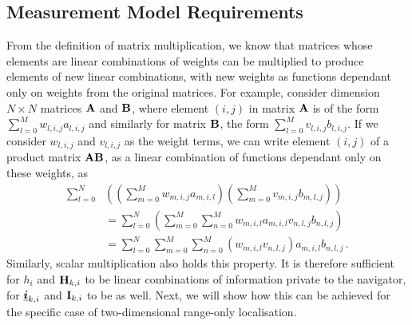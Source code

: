 \documentclass[twocolumn]{autart}
\begin{document}
% 
% 

\subsection{Measurement Model Requirements}
From the definition of matrix multiplication, we know that matrices whose elements are linear combinations of weights can be multiplied to produce elements of new linear combinations, with new weights as functions dependant only on weights from the original matrices. For example, consider dimension $N\times N$ matrices ${{\mathbf{A}}}$ and ${{\mathbf{B}}}$, where element $(i,j)$ in matrix ${{\mathbf{A}}}$ is of the form $\sum_{l=0}^M w_{l,i,j}a_{l,i,j}$ and similarly for matrix ${{\mathbf{B}}}$, the form $\sum_{l=0}^M v_{l,i,j}b_{l,i,j}$. If we consider $w_{l,i,j}$ and $v_{l,i,j}$ as the weight terms, we can write element $(i,j)$ of a product matrix ${{\mathbf{A}}}{{\mathbf{B}}}$, as a linear combination of functions dependant only on these weights, as
\begin{equation}
    \begin{split}
        \sum_{l=0}^N&\left(\left(\sum_{m=0}^M w_{m,i,j}a_{m,i,l}\right)\left(\sum_{m=0}^Mv_{m,i,j}b_{m,l,j}\right)\right) \\
        &=\sum_{l=0}^N\left(\sum_{m=0}^M\sum_{n=0}^M w_{m,i,l}a_{m,i,l}v_{n,l,j}b_{n,l,j}\right) \\
        &=\sum_{l=0}^N\sum_{m=0}^M\sum_{n=0}^M (w_{m,i,l}v_{n,l,j})a_{m,i,l}b_{n,l,j}\,.
    \end{split} \label{eqn:matrix_mult_weights}
\end{equation}
Similarly, scalar multiplication also holds this property. It is therefore sufficient for $h_i$ and ${{\mathbf{H}}}_{k,i}$ to be linear combinations of information private to the navigator, for ${\boldsymbol{\underline{i}}}_{k,i}$ and ${{\mathbf{I}}}_{k,i}$ to be as well. Next, we will show how this can be achieved for the specific case of two-dimensional range-only localisation.

% 
% 
\end{document}

